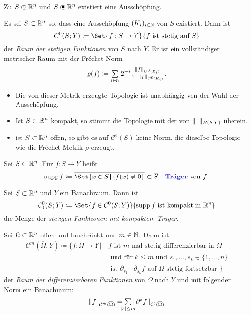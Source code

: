 \documentclass{cheat-sheet}
\begin{document}
\begin{bem}
  Zu $S \opn \R^n$ und $S \cls \R^n$ existiert eine Ausschöpfung.
\end{bem}

\begin{defn}
  Es sei $S \subset \mathbb{R}^n$ so, dass eine Ausschöpfung $(K_i)_{i \in \mathbb{N}}$ von $S$ existiert. Dann ist
  \[ C^0(S; Y) \coloneqq \Set{ f : S \to Y }{ f \text{ ist stetig auf } S } \]
  der \emph{Raum der stetigen Funktionen} von $S$ nach $Y$. Er ist ein vollständiger metrischer Raum mit der Fréchet-Norm
  \[ \varrho(f) \coloneqq \sum_{i \in \N} 2^{-i} \tfrac{ \norm{f}_{C^0(K_i)} }{ 1 + \norm{f}_{C^0(K_i)} }. \]
\end{defn}

\begin{bem}
  \begin{itemize}
    \item Die von dieser Metrik erzeugte Topologie ist unabhängig von der Wahl der Ausschöpfung.
    \item Ist $S \subset \mathbb{R}^n$ kompakt, so stimmt die Topologie mit der von $\lVert\text{--}\rVert_{B(S,Y)}$ überein.
    \item ist $S \subset \mathbb{R}^n$ offen, so gibt es auf $\mathcal{C}^0(S)$ keine Norm, die dieselbe Topologie wie die Fréchet-Metrik $\rho$ erzeugt.
  \end{itemize}
\end{bem}

\begin{defn}
  Sei $S \subset \mathbb{R}^n$. Für $f : S \to Y$ heißt
  \[ \supp f \coloneqq \overline{\Set{ x \in S }{ f(x) \not= 0 }} \subset \overline{S} \quad \text{\emph{Träger} von $f$.} \]
\end{defn}

\begin{defn}
  Sei $S \subset \mathbb{R}^n$ und $Y$ ein Banachraum. Dann ist
  \[ \mathcal{C}_0^0(S; Y) \coloneqq \Set{ f \in \mathcal{C}^0(S; Y) }{ \supp f \text{ ist kompakt in } \R^n } \]
  die Menge der \emph{stetigen Funktionen mit kompaktem Träger}. %
\end{defn}

\begin{defn}
  Sei $\Omega \subset \mathbb{R}^n$ offen und beschränkt und $m \in \mathbb{N}$. Dann ist
  \begin{align*}
    \mathcal{C}^m(\overline\Omega, Y) \coloneqq \{ f : \Omega \to Y \,|\, & f \text{ ist $m$-mal stetig differenzierbar in $\Omega$ } \\[-2pt]
    & \text{ und für $k \leq m$ und } s_1, ..., s_k \in \{ 1, ..., n \} \\[-2pt]
    & \text{ ist $\partial_{s_1} \cdots \partial_{s_k} f$ auf $\overline\Omega$ stetig fortsetzbar } \}
  \end{align*}
  der \emph{Raum der differenzierbaren Funktionen} von $\Omega$ nach $Y$ und mit folgender Norm ein Banachraum:
  \[ \norm{f}_{\mathcal{C}^m(\overline\Omega)} = \sum_{\mathclap{\abs{s} \leq m}} \, \norm{\partial^s f}_{\mathcal{C}^0(\overline\Omega)} \]
\end{defn}
\end{document}
